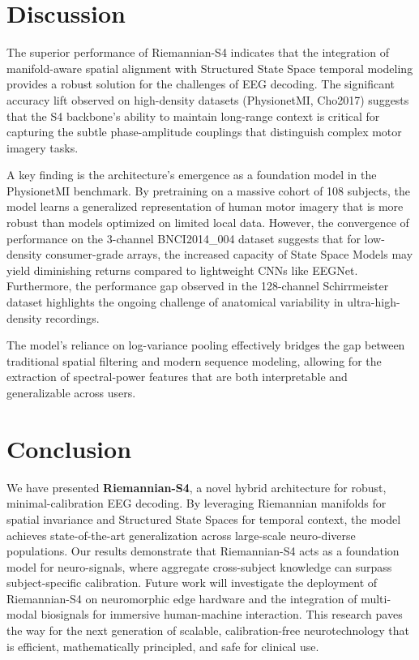\documentclass[11pt,a4paper]{article}
\begin{document}
\section{Discussion}
The superior performance of Riemannian-S4 indicates that the integration of manifold-aware spatial alignment with Structured State Space temporal modeling provides a robust solution for the challenges of EEG decoding. The significant accuracy lift observed on high-density datasets (PhysionetMI, Cho2017) suggests that the S4 backbone's ability to maintain long-range context is critical for capturing the subtle phase-amplitude couplings that distinguish complex motor imagery tasks.

A key finding is the architecture's emergence as a foundation model in the PhysionetMI benchmark. By pretraining on a massive cohort of 108 subjects, the model learns a generalized representation of human motor imagery that is more robust than models optimized on limited local data. However, the convergence of performance on the 3-channel BNCI2014\_004 dataset suggests that for low-density consumer-grade arrays, the increased capacity of State Space Models may yield diminishing returns compared to lightweight CNNs like EEGNet. Furthermore, the performance gap observed in the 128-channel Schirrmeister dataset highlights the ongoing challenge of anatomical variability in ultra-high-density recordings.

The model's reliance on log-variance pooling effectively bridges the gap between traditional spatial filtering and modern sequence modeling, allowing for the extraction of spectral-power features that are both interpretable and generalizable across users. 

\section{Conclusion}
We have presented \textbf{Riemannian-S4}, a novel hybrid architecture for robust, minimal-calibration EEG decoding. By leveraging Riemannian manifolds for spatial invariance and Structured State Spaces for temporal context, the model achieves state-of-the-art generalization across large-scale neuro-diverse populations. Our results demonstrate that Riemannian-S4 acts as a foundation model for neuro-signals, where aggregate cross-subject knowledge can surpass subject-specific calibration. Future work will investigate the deployment of Riemannian-S4 on neuromorphic edge hardware and the integration of multi-modal biosignals for immersive human-machine interaction. This research paves the way for the next generation of scalable, calibration-free neurotechnology that is efficient, mathematically principled, and safe for clinical use.
\end{document}
